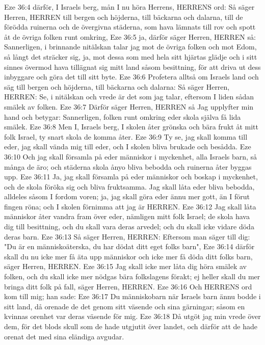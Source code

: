 Eze 36:4  därför, I Israels berg, mån I nu höra Herrens, HERRENS ord: Så säger Herren, HERREN till bergen och höjderna, till bäckarna och dalarna, till de förödda ruinerna och de övergivna städerna, som hava lämnats till rov och spott åt de övriga folken runt omkring,
Eze 36:5  ja, därför säger Herren, HERREN så: Sannerligen, i brinnande nitälskan talar jag mot de övriga folken och mot Edom, så långt det sträcker sig, ja, mot dessa som med hela sitt hjärtas glädje och i sitt sinnes övermod hava tillägnat sig mitt land såsom besittning, för att driva ut dess inbyggare och göra det till sitt byte.
Eze 36:6  Profetera alltså om Israels land och säg till bergen och höjderna, till bäckarna och dalarna: Så säger Herren, HERREN: Se, i nitälskan och vrede är det som jag talar, eftersom I liden sådan smälek av folken.
Eze 36:7  Därför säger Herren, HERREN så Jag upplyfter min hand och betygar: Sannerligen, folken runt omkring eder skola själva få lida smälek.
Eze 36:8  Men I, Israels berg, I skolen åter grönska och bära frukt åt mitt folk Israel, ty snart skola de komma åter.
Eze 36:9  Ty se, jag skall komma till eder, jag skall vända mig till eder, och I skolen bliva brukade och besådda.
Eze 36:10  Och jag skall församla på eder människor i myckenhet, alla Israels barn, så många de äro; och städerna skola ånyo bliva bebodda och ruinerna åter byggas upp.
Eze 36:11  Ja, jag skall församla på eder människor och boskap i myckenhet, och de skola föröka sig och bliva fruktsamma. Jag skall låta eder bliva bebodda, alldeles såsom I fordom voren; ja, jag skall göra eder ännu mer gott, än I förut fingen röna; och I skolen förnimma att jag är HERREN.
Eze 36:12  Jag skall låta människor åter vandra fram över eder, nämligen mitt folk Israel; de skola hava dig till besittning, och du skall vara deras arvedel; och du skall icke vidare döda deras barn.
Eze 36:13  Så säger Herren, HERREN: Eftersom man säger till dig: "Du är en människoäterska, du har dödat ditt eget folks barn",
Eze 36:14  därför skall du nu icke mer få äta upp människor och icke mer få döda ditt folks barn, säger Herren, HERREN.
Eze 36:15  Jag skall icke mer låta dig höra smälek av folken, och du skall icke mer nödgas bära folkslagens förakt; ej heller skall du mer bringa ditt folk på fall, säger Herren, HERREN.
Eze 36:16  Och HERRENS ord kom till mig; han sade:
Eze 36:17  Du människobarn när Israels barn ännu bodde i sitt land, då orenade de det genom sitt väsende och sina gärningar; såsom en kvinnas orenhet var deras väsende för mig.
Eze 36:18  Då utgöt jag min vrede över dem, för det blods skull som de hade utgjutit över landet, och därför att de hade orenat det med sina eländiga avgudar.
